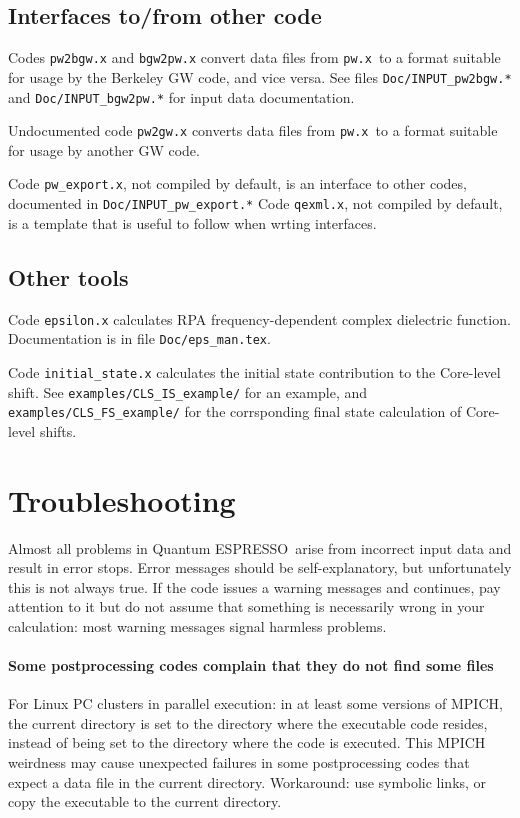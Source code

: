 \documentclass[12pt,a4paper]{article}
\def\qe{{\sc Quantum ESPRESSO}}
\def\pwx{\texttt{pw.x}}
\begin{document}
\subsection{Interfaces to/from other code}

Codes \texttt{pw2bgw.x} and \texttt{bgw2pw.x} convert data files from
\pwx\ to a format suitable for usage by the Berkeley GW code, and vice
versa. See files \texttt{Doc/INPUT\_pw2bgw.*} and \texttt{Doc/INPUT\_bgw2pw.*}
for input data documentation.

Undocumented code \texttt{pw2gw.x} converts data files from \pwx\ to
a format suitable for usage by another GW code.

Code \texttt{pw\_export.x}, not compiled by default, is an interface
to other codes, documented in \texttt{Doc/INPUT\_pw\_export.*}
Code \texttt{qexml.x}, not compiled by default, is a template that
is useful to follow when wrting interfaces.

\subsection{Other tools}

Code \texttt{epsilon.x} calculates RPA frequency-dependent complex dielectric 
function. Documentation is in file \texttt{Doc/eps\_man.tex}.

Code \texttt{initial\_state.x} calculates the initial state contribution
to the Core-level shift. See \texttt{examples/CLS\_IS\_example/} for
an example, and \texttt{examples/CLS\_FS\_example/} for the corrsponding
final state calculation of Core-level shifts.

\section{Troubleshooting}

Almost all problems in \qe\ arise from incorrect input data and result in
error stops. Error messages should be self-explanatory, but unfortunately
this is not always true. If the code issues a warning messages and continues,
pay attention to it but do not assume that something is necessarily wrong in
your calculation: most warning messages signal harmless problems.

\paragraph{Some postprocessing codes complain that they do not find some files}
For Linux PC clusters in parallel execution: in at least some versions
of MPICH, the current directory is set to the directory where the executable
code resides, instead of being set to the directory where the code is executed.
This MPICH weirdness may cause unexpected failures in some postprocessing
codes that expect a data file in the current directory. Workaround: use
symbolic links, or copy the executable to the current directory.
\end{document}

